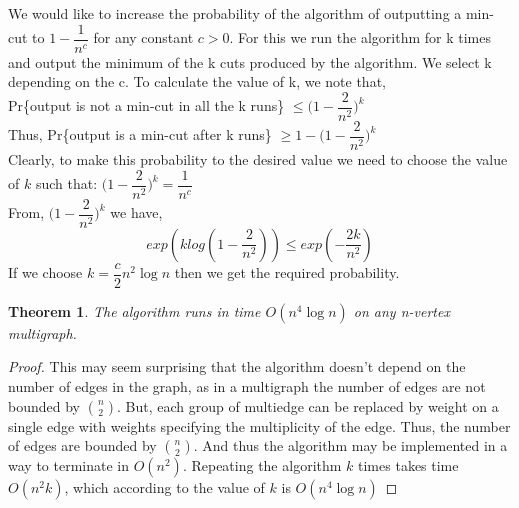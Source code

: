 \documentclass[a4paper,10pt]{article}
\newtheorem{myth}{Theorem}
\begin{document}
We would like to increase the probability of the algorithm of outputting a min-cut to $1- \dfrac{1}{n^{c}}$
for any constant $c > 0$. For this we run the algorithm for k times and output the minimum of the k cuts
produced by the algorithm. We select k depending on the c. To calculate the value of k, we note that,\\

Pr\{output is not a min-cut in all the k runs\} $\leq \big(1-\dfrac{2}{n^{2}}\big)^k$\\
Thus, Pr\{output is a min-cut after k runs\} $\geq 1-\big(1- \dfrac{2}{n^{2}}\big)^k$\\

Clearly, to make this probability to the desired value we need to choose the value of $k$ such that:
$\big(1- \dfrac{2}{n^{2}}\big)^k = \dfrac{1}{n^{c}}$\\
From, $\big(1- \dfrac{2}{n^{2}}\big)^k$ we have,\\
\begin{equation*}
 exp(k log(1-\dfrac{2}{n^{2}})) \leq exp(-\dfrac{2k}{n^{2}})
\end{equation*}
If we choose $k=\dfrac{c}{2}n^{2}\log n$ then we get the required probability.

\begin{myth}
 The algorithm runs in time $O(n^{4}\log n)$ on any n-vertex multigraph.
\end{myth}

\begin{proof}
 This may seem surprising that the algorithm doesn't depend on the number of edges in the graph, as 
in a multigraph the number of edges are not bounded by ${n}\choose{2}$. But, each group of multiedge
can be replaced by weight on a single edge with weights specifying the multiplicity of the edge. Thus,
the number of edges are bounded by ${n}\choose{2}$. And thus the algorithm may be implemented in a way
to terminate in $O(n^{2})$. Repeating the algorithm $k$ times takes time $O(n^{2}k)$, which according
to the value of $k$ is $O(n^{4}\log n)$
\end{proof}
\end{document}
